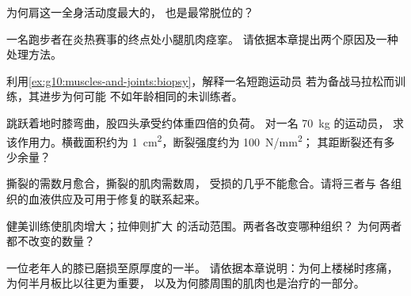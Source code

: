 \begin{exercise}[$\star\star$]\label{exo:g10:muscles-and-joints:9}
为何肩这一全身活动度最大的，
也是最常脱位的？
\end{exercise}

\begin{exercise}[$\star\star$]\label{exo:g10:muscles-and-joints:10}
一名跑步者在炎热赛事的终点处小腿肌肉痉挛。
请依据本章提出两个原因及一种处理方法。
\end{exercise}

\begin{exercise}[$\star\star$]\label{exo:g10:muscles-and-joints:11}
利用\cref{ex:g10:muscles-and-joints:biopsy}，解释一名短跑运动员
若为备战马拉松而训练，其进步为何可能
不如年龄相同的未训练者。
\end{exercise}

\begin{exercise}[$\star\star\star$]\label{exo:g10:muscles-and-joints:12}
跳跃着地时膝弯曲，股四头承受约体重四倍的负荷。
对一名 \qty{70}{kg} 的运动员，
求该作用力。横截面积约为
\qty{1}{cm^2}，断裂强度约为 \qty{100}{N/mm^2}；
其距断裂还有多少余量？
\end{exercise}

\begin{exercise}[$\star\star\star$]\label{exo:g10:muscles-and-joints:13}
撕裂的需数月愈合，撕裂的肌肉需数周，
受损的几乎不能愈合。请将三者与
各组织的血液供应及可用于修复的联系起来。
\end{exercise}

\begin{exercise}[$\star\star\star$]\label{exo:g10:muscles-and-joints:14}
健美训练使肌肉增大；拉伸则扩大
的活动范围。两者各改变哪种组织？
为何两者都不改变的数量？
\end{exercise}

\begin{exercise}[$\star\star\star$]\label{exo:g10:muscles-and-joints:15}
一位老年人的膝已磨损至原厚度的一半。
请依据本章说明：为何上楼梯时疼痛，
为何半月板比以往更为重要，
以及为何膝周围的肌肉也是治疗的一部分。
\end{exercise}

